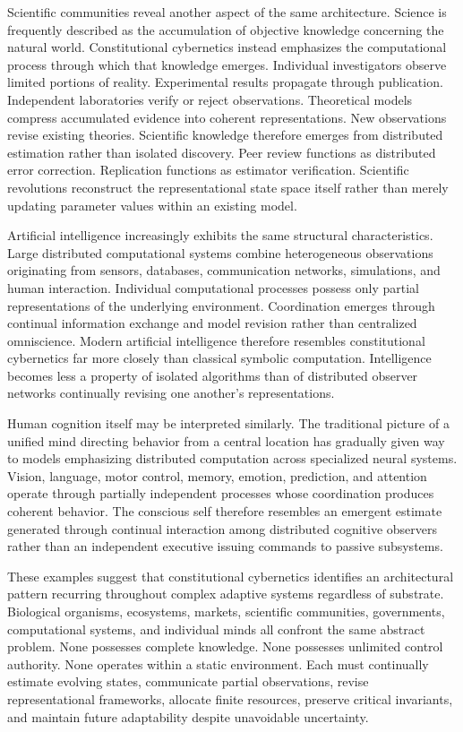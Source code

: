 \documentclass[12pt,a4paper]{article}
\begin{document}
Scientific communities reveal another aspect of the same architecture. Science is frequently described as the accumulation of objective knowledge concerning the natural world. Constitutional cybernetics instead emphasizes the computational process through which that knowledge emerges. Individual investigators observe limited portions of reality. Experimental results propagate through publication. Independent laboratories verify or reject observations. Theoretical models compress accumulated evidence into coherent representations. New observations revise existing theories. Scientific knowledge therefore emerges from distributed estimation rather than isolated discovery. Peer review functions as distributed error correction. Replication functions as estimator verification. Scientific revolutions reconstruct the representational state space itself rather than merely updating parameter values within an existing model.

Artificial intelligence increasingly exhibits the same structural characteristics. Large distributed computational systems combine heterogeneous observations originating from sensors, databases, communication networks, simulations, and human interaction. Individual computational processes possess only partial representations of the underlying environment. Coordination emerges through continual information exchange and model revision rather than centralized omniscience. Modern artificial intelligence therefore resembles constitutional cybernetics far more closely than classical symbolic computation. Intelligence becomes less a property of isolated algorithms than of distributed observer networks continually revising one another's representations.

Human cognition itself may be interpreted similarly. The traditional picture of a unified mind directing behavior from a central location has gradually given way to models emphasizing distributed computation across specialized neural systems. Vision, language, motor control, memory, emotion, prediction, and attention operate through partially independent processes whose coordination produces coherent behavior. The conscious self therefore resembles an emergent estimate generated through continual interaction among distributed cognitive observers rather than an independent executive issuing commands to passive subsystems.

These examples suggest that constitutional cybernetics identifies an architectural pattern recurring throughout complex adaptive systems regardless of substrate. Biological organisms, ecosystems, markets, scientific communities, governments, computational systems, and individual minds all confront the same abstract problem. None possesses complete knowledge. None possesses unlimited control authority. None operates within a static environment. Each must continually estimate evolving states, communicate partial observations, revise representational frameworks, allocate finite resources, preserve critical invariants, and maintain future adaptability despite unavoidable uncertainty.
\end{document}
